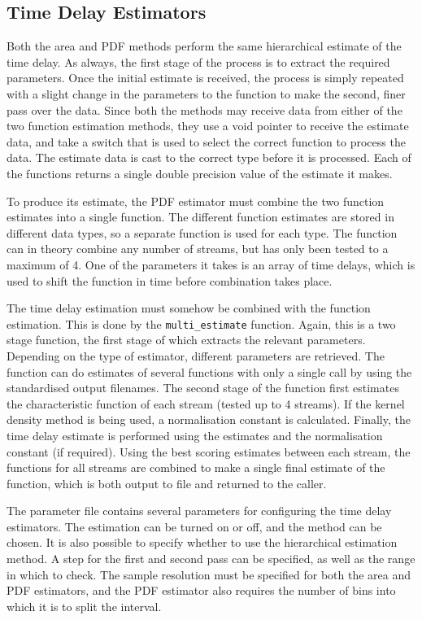\documentclass[a4paper,11pt,twoside]{article}
\begin{document}
\subsection{Time Delay Estimators}
\label{sec-6-8}

   Both the area and PDF methods perform the same hierarchical estimate of the
   time delay. As always, the first stage of the process is to extract the
   required parameters. Once the initial estimate is received, the process is
   simply repeated with a slight change in the parameters to the function to
   make the second, finer pass over the data. Since both the methods may receive
   data from either of the two function estimation methods, they use a void
   pointer to receive the estimate data, and take a switch that is used to
   select the correct function to process the data. The estimate data is cast to
   the correct type before it is processed. Each of the functions returns a
   single double precision value of the estimate it makes.

   To produce its estimate, the PDF estimator must combine the two function
   estimates into a single function. The different function estimates are stored
   in different data types, so a separate function is used for each type. The
   function can in theory combine any number of streams, but has only been
   tested to a maximum of 4. One of the parameters it takes is an array of time
   delays, which is used to shift the function in time before combination takes
   place.

   The time delay estimation must somehow be combined with the function
   estimation. This is done by the \texttt{multi\_estimate} function. Again,
   this is a two stage function, the first stage of which extracts the relevant
   parameters. Depending on the type of estimator, different parameters are
   retrieved. The function can do estimates of several functions with only a
   single call by using the standardised output filenames. The second stage of
   the function first estimates the characteristic function of each stream
   (tested up to 4 streams). If the kernel density method is being used, a
   normalisation constant is calculated. Finally, the time delay estimate is
   performed using the estimates and the normalisation constant (if
   required). Using the best scoring estimates between each stream, the
   functions for all streams are combined to make a single final estimate of the
   function, which is both output to file and returned to the caller.

   The parameter file contains several parameters for configuring the time delay
   estimators. The estimation can be turned on or off, and the method can be
   chosen. It is also possible to specify whether to use the hierarchical
   estimation method. A step for the first and second pass can be specified, as
   well as the range in which to check. The sample resolution must be specified
   for both the area and PDF estimators, and the PDF estimator also requires the
   number of bins into which it is to split the interval.
\end{document}
